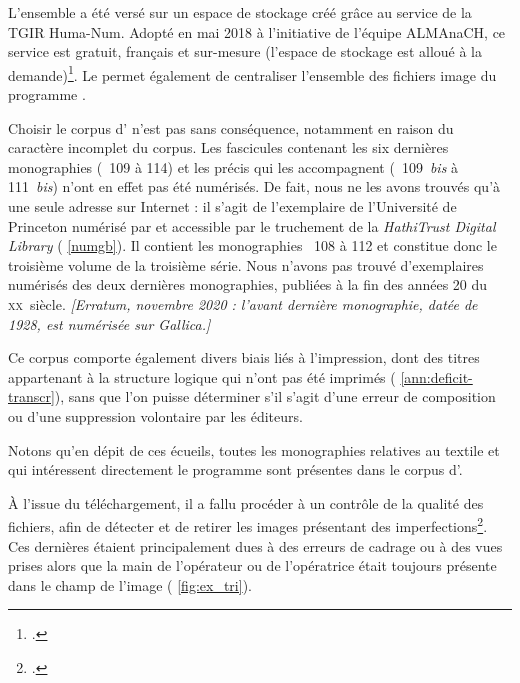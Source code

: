 L'ensemble a été versé sur un espace de stockage créé grâce au service \sharedocs{} de la TGIR Huma-Num. Adopté en mai 2018 à l'initiative de l'équipe ALMAnaCH, ce service est gratuit, français et sur-mesure (l'espace de stockage est alloué à la demande)\footcite[p. 33-34]{chague2}. Le \sharedocs{} permet également de centraliser l'ensemble des fichiers image du programme \timeus.

Choisir le corpus d'\ia{} n'est pas sans conséquence, notamment en raison du caractère incomplet du corpus. Les fascicules contenant les six dernières monographies (\nos{}~109 à 114) et les précis qui les accompagnent (\nos{}~109~\textit{bis} à 111~\textit{bis}) n'ont en effet pas été numérisés. De fait, nous ne les avons trouvés qu'à une seule adresse sur Internet : il s'agit de l'exemplaire de l'Université de Princeton numérisé par \gb{} et accessible par le truchement de la \textit{HathiTrust Digital Library} (\ann{} \ref{numgb}). Il contient les monographies \nos{}~108 à 112 et constitue donc le troisième volume de la troisième série. Nous n'avons pas trouvé d'exemplaires numérisés des deux dernières monographies, publiées à la fin des années 20 du \textsc{xx}\ieme~siècle. \textit{[Erratum, novembre 2020 : l'avant dernière monographie, datée de 1928, est numérisée sur Gallica.]}

Ce corpus comporte également divers biais liés à l'impression, dont des titres appartenant à la structure logique qui n'ont pas été imprimés (\ann{} \ref{ann:deficit-transcr}), sans que l'on puisse déterminer s'il s'agit d'une erreur de composition ou d'une suppression volontaire par les éditeurs. 

Notons qu'en dépit de ces écueils, toutes les monographies relatives au textile et qui intéressent directement le programme \timeus{} sont présentes dans le corpus d'\ia.

À l'issue du téléchargement, il a fallu procéder à un contrôle de la qualité des fichiers, afin de détecter et de retirer les images présentant des imperfections\footcite{chague2}. Ces dernières étaient principalement dues à des erreurs de cadrage ou à des vues prises alors que la main de l'opérateur ou de l'opératrice était toujours présente dans le champ de l'image (\fig{} \ref{fig:ex_tri}).

